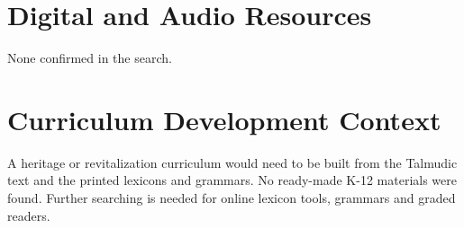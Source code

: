 \documentclass[12pt]{article}
\begin{document}
\section{Digital and Audio Resources}
None confirmed in the search.

\section{Curriculum Development Context}
A heritage or revitalization curriculum would need to be built from the Talmudic text and the printed lexicons and grammars. No ready-made K-12 materials were found. Further searching is needed for online lexicon tools, grammars and graded readers.
\end{document}
